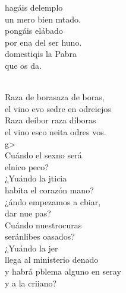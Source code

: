 \begin{cancion}%
	 hagáis delemplo\\
	un mero bien mtado.\\
	 pongáis elábado\\
	por ena del ser huno.\\
	 domestiqis la Pabra \\
	que os da.\\\jump\\
	\begin{chorus}%
	Raza de borasaza de boras, \\
	el vino evo sedre en odreiejos\\
	Raza deíbor raza díboras\\
	el vino esco neita odres vos.\\
	g>  \\
	Cuándo el sexno será\\
	elnico peco?\\
	¿Yuándo la jticia \\
	habita el corazón mano?\\
	¿ándo empezamos a cbiar,\\
	dar nue pas?\\
	Cuándo nuestrocuras\\
	seránlibes oasados? \\
	¿Yuándo la jer \\
	llega al ministerio denado\\
	y  habrá pblema alguno en seray\\
	y a la  criiano?\\\jump\\

\end{chorus}
\end{cancion}

